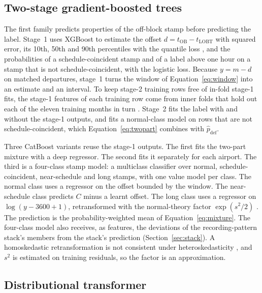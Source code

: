 \documentclass[
  manuscript=article,  %
  layout=preprint,  %
  year=20xx,
  volume=x,
]{extra/joas}
\begin{document}
\subsection{Two-stage gradient-boosted trees}
\label{sec:gbm}

The first family predicts properties of the off-block stamp before predicting the label. Stage~1 uses XGBoost \cite{chen2016xgboost} to estimate the offset $d = t_{\mathrm{OB}} - t_{\mathrm{LOBT}}$ with squared error, its 10th, 50th and 90th percentiles with the quantile loss \cite{koenker1978regression}, and the probabilities of a schedule-coincident stamp and of a label above one hour on a stamp that is not schedule-coincident, with the logistic loss. Because $y = m - d$ on matched departures, stage~1 turns the window of Equation~\eqref{eq:window} into an estimate and an interval. To keep stage-2 training rows free of in-fold stage-1 fits, the stage-1 features of each training row come from inner folds that hold out each of the eleven training months in turn \cite{varma2006bias,chernozhukov2018double}. Stage~2 fits the label with and without the stage-1 outputs, and fits a normal-class model on rows that are not schedule-coincident, which Equation~\eqref{eq:twopart} combines with $\hat{p}_{\mathrm{def}}$.

Three CatBoost variants \cite{prokhorenkova2018catboost} reuse the stage-1 outputs. The first fits the two-part mixture with a deep regressor. The second fits it separately for each airport. The third is a four-class stamp model: a multiclass classifier over normal, schedule-coincident, near-schedule and long stamps, with one value model per class. The normal class uses a regressor on the offset bounded by the window. The near-schedule class predicts $C$ minus a learnt offset. The long class uses a regressor on $\log(y-3600+1)$, retransformed with the normal-theory factor $\exp(s^2/2)$ \cite{belotti2015twopm}. The prediction is the probability-weighted mean of Equation~\eqref{eq:mixture}. The four-class model also receives, as features, the deviations of the recording-pattern stack's members from the stack's prediction (Section~\ref{sec:stack}). A homoskedastic retransformation is not consistent under heteroskedasticity \cite{belotti2015twopm,manning1998logged}, and $s^2$ is estimated on training residuals, so the factor is an approximation.

\subsection{Distributional transformer}
\label{sec:transformer}
\end{document}
